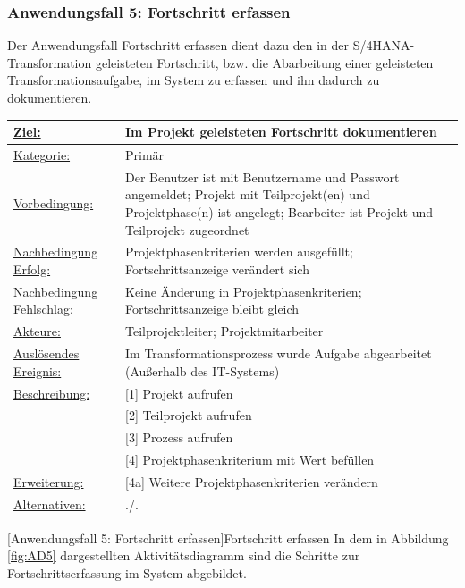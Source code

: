 \newpage
\subsubsection{Anwendungsfall 5: Fortschritt erfassen}
Der Anwendungsfall \glqq{}Fortschritt erfassen\grqq{} dient dazu den in der S/4HANA-Transformation geleisteten Fortschritt, bzw. die Abarbeitung einer geleisteten Transformationsaufgabe, im System zu erfassen und ihn dadurch zu dokumentieren.\\

\begin{tabularx}{\textwidth}{|p{}|p{}|}
        \hline
        \underline{Ziel:} & Im Projekt geleisteten Fortschritt dokumentieren \\\hline
        \underline{Kategorie:} & Primär \\\hline
        \underline{Vorbedingung:} & Der Benutzer ist mit Benutzername und Passwort angemeldet; Projekt mit Teilprojekt(en) und Projektphase(n) ist angelegt; Bearbeiter ist Projekt und Teilprojekt zugeordnet \\\hline
        \underline{Nachbedingung Erfolg:} & Projektphasenkriterien werden ausgefüllt; Fortschrittsanzeige verändert sich \\\hline
        \underline{Nachbedingung Fehlschlag:} & Keine Änderung in Projektphasenkriterien; Fortschrittsanzeige bleibt gleich \\\hline
        \underline{Akteure:} & Teilprojektleiter; Projektmitarbeiter \\\hline
        \underline{Auslösendes Ereignis:} & Im Transformationsprozess wurde Aufgabe abgearbeitet (Außerhalb des IT-Systems)\\\hline        
        \multirow{1}{*}{\underline{Beschreibung:}} & [1] Projekt aufrufen \\
        & [2] Teilprojekt aufrufen \\
        & [3] Prozess aufrufen \\
        & [4] Projektphasenkriterium mit Wert befüllen \\\hline
        \multirow{1}{*}{\underline{Erweiterung:}} & [4a] Weitere Projektphasenkriterien verändern \\\hline
        \underline{Alternativen:} & ./. \\\hline
\end{tabularx}
[Anwendungsfall 5: Fortschritt erfassen]{Fortschritt erfassen}
\newpage
In dem in Abbildung \ref{fig:AD5} dargestellten Aktivitätsdiagramm sind die Schritte zur Fortschrittserfassung im System abgebildet.

